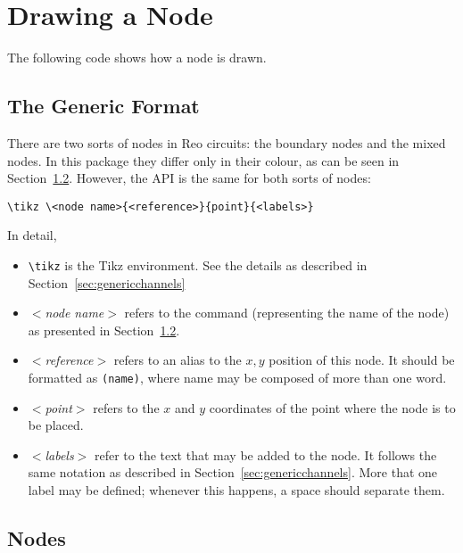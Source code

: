 \documentclass[11pt]{article}
\begin{document}
\section{Drawing a Node}

The following code shows how a node is drawn.

\subsection{The Generic Format}

There are two sorts of nodes in Reo circuits: the boundary nodes and the mixed nodes. In this package they differ only in their colour, as can be seen in Section~\ref{sec:nodes}. However, the API is the same for both sorts of nodes:

\begin{verbatim}
\tikz \<node name>{<reference>}{point}{<labels>}
\end{verbatim}

In detail,

\begin{itemize}

\item \verb+\tikz+ is the Tikz environment. See the details as described in Section~\ref{sec:genericchannels}

\item \emph{$<$node name$>$} refers to the command (representing the name of the node) as presented in Section~\ref{sec:nodes}. 

\item \emph{$<$reference$>$} refers to an alias to the $x,y$ position of this node. It should be formatted as \verb+(name)+, where name may be composed of more than one word. 

\item \emph{$<$point$>$} refers to the $x$ and $y$ coordinates of the point where the node is to be placed.

\item \emph{$<$labels$>$} refer to the text that may be added to the node. It follows the same notation as described in Section~\ref{sec:genericchannels}. More that one label may be defined; whenever this happens, a space should separate them.
\end{itemize}


\subsection{Nodes}\label{sec:nodes}
\end{document}
